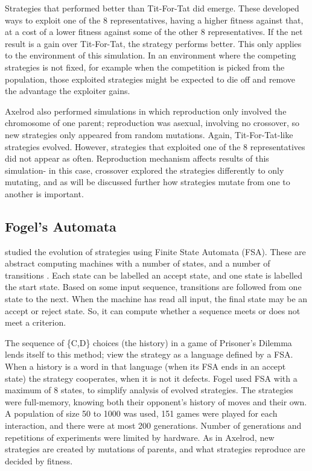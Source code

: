 \documentclass[a4paper,11pt,bcshonoursthesis,singlespace,twoside,thesisdraft,pdflatex]{cssethesis}
\begin{document}
Strategies that performed better than Tit-For-Tat did emerge. These developed ways to exploit one of the 8 representatives, having a higher fitness against that, at a cost of a lower fitness against some of the other 8 representatives. If the net result is a gain over Tit-For-Tat, the strategy performs better. 
This only applies to the environment of this simulation. 
In an environment where the competing strategies is not fixed, for example when the competition is picked from the population, those exploited strategies might be expected to die off and remove the advantage the exploiter gains. 

Axelrod also performed simulations in which reproduction only involved the chromosome of one parent; reproduction was asexual, involving no crossover, so new strategies only appeared from random mutations. 
Again, Tit-For-Tat-like strategies evolved. However, strategies that exploited one of the 8 representatives did not appear as often. Reproduction mechanism affects results of this simulation- in this case, crossover explored the strategies differently to only mutating, and as will be discussed further how strategies mutate from one to another is important. 

\subsection{Fogel's Automata}
\citet{fogel1993evolving} studied the evolution of strategies using Finite State Automata (FSA). 
These are abstract computing machines with a number of states, and a number of transitions \citep{Sipser2006}. 
Each state can be labelled an accept state, and one state is labelled the start state. 
Based on some input sequence, transitions are followed from one state to the next. 
When the machine has read all input, the final state may be an accept or reject state. 
So, it can compute whether a sequence meets or does not meet a criterion. 

The sequence of \{C,D\} choices (the history) in a game of Prisoner's Dilemma lends itself to this method; view the strategy as a language defined by a FSA. When a history is a word in that language (when its FSA ends in an accept state) the strategy cooperates, when it is not it defects. Fogel used FSA with a maximum of 8 states, to simplify analysis of evolved strategies. The strategies were full-memory, knowing both their opponent's history of moves and their own. 
A population of size 50 to 1000 was used, 151 games were played for each interaction, and there were at most 200 generations. 
Number of generations and repetitions of experiments were limited by hardware. As in Axelrod, new strategies are created by mutations of parents, and what strategies reproduce are decided by fitness. 
\end{document}
